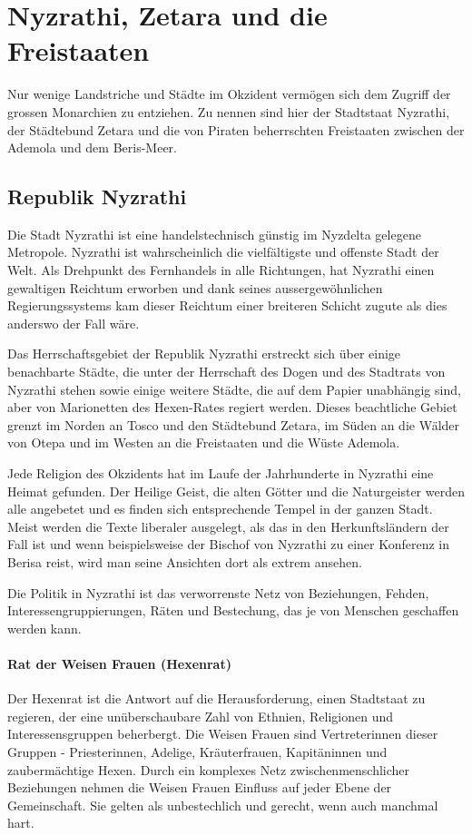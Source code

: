 \documentclass[10pt,twoside,twocolumn,openany]{book}
\begin{document}
\chapter{Nyzrathi, Zetara und die Freistaaten}
Nur wenige Landstriche und Städte im Okzident vermögen sich dem Zugriff der grossen Monarchien zu entziehen. Zu nennen sind hier der Stadtstaat Nyzrathi, der Städtebund Zetara und die von Piraten beherrschten Freistaaten zwischen der Ademola und dem Beris-Meer.

\section{Republik Nyzrathi}
Die Stadt Nyzrathi ist eine handelstechnisch günstig im Nyzdelta gelegene Metropole. Nyzrathi ist wahrscheinlich die vielfältigste und offenste Stadt der Welt. Als Drehpunkt des Fernhandels in alle Richtungen, hat Nyzrathi einen gewaltigen Reichtum erworben und dank seines aussergewöhnlichen Regierungssystems kam dieser Reichtum einer breiteren Schicht zugute als dies anderswo der Fall wäre.

Das Herrschaftsgebiet der Republik Nyzrathi erstreckt sich über einige benachbarte Städte, die unter der Herrschaft des Dogen und des Stadtrats von Nyzrathi stehen sowie einige weitere Städte, die auf dem Papier unabhängig sind, aber von Marionetten des Hexen-Rates regiert werden. Dieses beachtliche Gebiet grenzt im Norden an Tosco und den Städtebund Zetara, im Süden an die Wälder von Otepa und im Westen an die Freistaaten und die Wüste Ademola.

Jede Religion des Okzidents hat im Laufe der Jahrhunderte in Nyzrathi eine Heimat gefunden. Der Heilige Geist, die alten Götter und die Naturgeister werden alle angebetet und es finden sich entsprechende Tempel in der ganzen Stadt. Meist werden die Texte liberaler ausgelegt, als das in den Herkunftsländern der Fall ist und wenn beispielsweise der Bischof von Nyzrathi zu einer Konferenz in Berisa reist, wird man seine Ansichten dort als extrem ansehen.

Die Politik in Nyzrathi ist das verworrenste Netz von Beziehungen, Fehden, Interessengruppierungen, Räten und Bestechung, das je von Menschen geschaffen werden kann.

\subsubsection{Rat der Weisen Frauen (Hexenrat)} Der Hexenrat ist die Antwort auf die Herausforderung, einen Stadtstaat zu regieren, der eine unüberschaubare Zahl von Ethnien, Religionen und Interessensgruppen beherbergt. Die Weisen Frauen sind Vertreterinnen dieser Gruppen - Priesterinnen, Adelige, Kräuterfrauen, Kapitäninnen und zaubermächtige Hexen. Durch ein komplexes Netz zwischenmenschlicher Beziehungen nehmen die Weisen Frauen Einfluss auf jeder Ebene der Gemeinschaft. Sie gelten als unbestechlich und gerecht, wenn auch manchmal hart.
\end{document}
